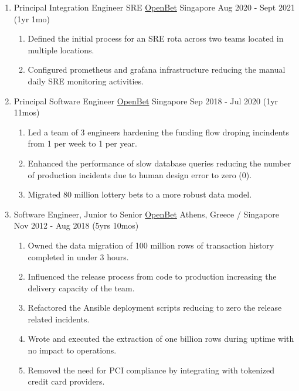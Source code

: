 \documentclass{CVSoftwareEngineer}
\begin{document}
\begin{enumerate}[labelwidth=!, labelindent=0pt, leftmargin=*, rightmargin=15pt]
		\item[] \cvExperience
			{Principal Integration Engineer \textbar SRE}
			{\href{https://www.openbet.com/}{OpenBet}}
			{Singapore}
			{Aug 2020 - Sept 2021 (1yr 1mo)}
			{\begin{enumerate}[labelwidth=!, labelindent=0pt, nosep, leftmargin=*]
					\item[\textasteriskcentered] Defined the initial process for an SRE rota across two teams located in multiple locations.
					\item[\textasteriskcentered] Configured prometheus and grafana infrastructure reducing the manual daily SRE monitoring activities.
				\end{enumerate}
			}

		\item[] \cvExperience
			{Principal Software Engineer}
			{\href{https://www.openbet.com/}{OpenBet}}
			{Singapore}
			{Sep 2018 - Jul 2020 (1yr 11mos)}
			{\begin{enumerate}[labelwidth=!, labelindent=0pt, nosep, leftmargin=*]
					\item[\textasteriskcentered] Led a team of 3 engineers hardening the
						funding flow droping incindents from 1 per week to 1 per year.
					\item[\textasteriskcentered] Enhanced the performance of slow database queries reducing
						the number of production incidents due to human design error to zero (0).
					\item[\textasteriskcentered] Migrated 80 million lottery bets to a more robust data model.
				\end{enumerate}
			}

		\item[] \cvExperience
			{Software Engineer, \scriptsize{Junior to Senior}}
			{\href{https://www.openbet.com/}{OpenBet}}
			{Athens, Greece / Singapore}
			{Nov 2012 - Aug 2018 (5yrs 10mos)}
			{
				\begin{enumerate}[labelwidth=!, labelindent=0pt, nosep, leftmargin=*]
					\item[\textasteriskcentered] Owned the data migration of 100 million rows of
						transaction history completed in under 3 hours.
					\item[\textasteriskcentered] Influenced the release process from code to
						production increasing the delivery capacity of the team.
					\item[\textasteriskcentered] Refactored the Ansible deployment scripts
						reducing to zero the release related incidents.
					\item[\textasteriskcentered] Wrote and executed the extraction of
						one billion rows during uptime with no impact to operations.
					\item[\textasteriskcentered] Removed the need for PCI compliance by
						integrating with tokenized credit card providers.
				\end{enumerate}
			}
	\end{enumerate}
\end{document}
